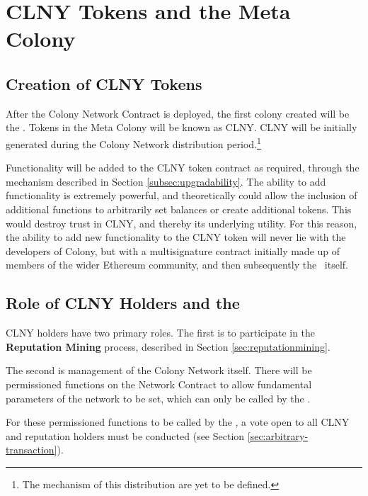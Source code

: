\section{CLNY Tokens and the Meta Colony}\label{sec:clny}

\subsection{Creation of CLNY Tokens}
After the Colony Network Contract is deployed, the first colony created will be the \rc. Tokens in the Meta Colony will be known as CLNY. CLNY will be initially generated during the Colony Network distribution period.\footnote{The mechanism of this distribution are yet to be defined.} %

Functionality will be added to the CLNY token contract as required, through the  mechanism described in Section  \ref{subsec:upgradability}. The ability to add functionality is extremely powerful, and theoretically could allow the inclusion of additional functions to arbitrarily set balances or create additional tokens. This would destroy trust in CLNY, and thereby its underlying utility. For this reason, the ability to add new functionality to the CLNY token will never lie with the developers of Colony, but with a multisignature contract initially made up of members of the wider Ethereum community, and then subsequently the \rc\ itself.

\subsection{Role of CLNY Holders and the \rc}
CLNY holders have two primary roles. The first is to participate in the \textbf{Reputation Mining} process, described in Section \ref{sec:reputationmining}.

The second is management of the Colony Network itself. There will be permissioned functions on the Network Contract to allow fundamental parameters of the network to be set, which can only be called by the \rc.

For these permissioned functions to be called by the \rc, a vote open to all CLNY and reputation holders must be conducted  (see Section \ref{sec:arbitrary-transaction}).

